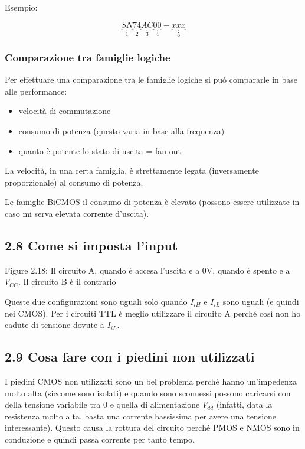 \documentclass[
]{article}
\providecommand{\tightlist}{%
  \setlength{\itemsep}{0pt}\setlength{\parskip}{0pt}}
\begin{document}
Esempio:

\[\underbrace{SN}_{1}\underbrace{74}_{2}\underbrace{AC}_{3}\underbrace{00}_{4}-
\underbrace{xxx}_{5}\]

\subsubsection{Comparazione tra famiglie
logiche}\label{comparazione-tra-famiglie-logiche}

Per effettuare una comparazione tra le famiglie logiche si può
compararle in base alle performance:

\begin{itemize}
\tightlist
\item
  velocità di commutazione
\item
  consumo di potenza (questo varia in base alla frequenza)
\item
  quanto è potente lo stato di uscita = fan out
\end{itemize}

La velocità, in una certa famiglia, è strettamente legata (inversamente
proporzionale) al consumo di potenza.

Le famiglie BiCMOS il consumo di potenza è elevato (possono essere
utilizzate in caso mi serva elevata corrente d'uscita).

\subsection{2.8 Come si imposta l'input}\label{come-si-imposta-linput}

Figure 2.18: Il circuito A, quando è accesa l'uscita e a 0V, quando è
spento e a \(V_{CC}\). Il circuito B è il contrario

Queste due configurazioni sono uguali solo quando \(I_{iH}\) e
\(I_{iL}\) sono uguali (e quindi nei CMOS). Per i circuiti TTL è meglio
utilizzare il circuito A perché così non ho cadute di tensione dovute a
\(I_{iL}\).

\subsection{2.9 Cosa fare con i piedini non
utilizzati}\label{cosa-fare-con-i-piedini-non-utilizzati}

I piedini CMOS non utilizzati sono un bel problema perché hanno
un'impedenza molto alta (siccome sono isolati) e quando sono sconnessi
possono caricarsi con della tensione variabile tra 0 e quella di
alimentazione \(V_{dd}\) (infatti, data la resistenza molto alta, basta
una corrente bassissima per avere una tensione interessante). Questo
causa la rottura del circuito perché PMOS e NMOS sono in conduzione e
quindi passa corrente per tanto tempo.
\end{document}
